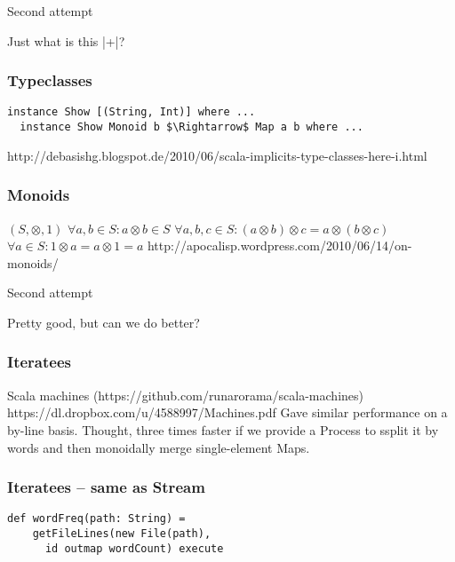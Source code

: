 \documentclass{beamer}
\begin{document}
\begin{frame}{Second attempt}
  \Large \centerline{Just what is this |+|?}
\end{frame}

\begin{frame}[fragile]
\frametitle{Typeclasses}
\begin{lstlisting}[mathescape]
  instance Show [(String, Int)] where ...
  instance Show Monoid b $\Rightarrow$ Map a b where ...
\end{lstlisting}
http://debasishg.blogspot.de/2010/06/scala-implicits-type-classes-here-i.html
\end{frame}

\begin{frame}[fragile]
\frametitle{Monoids}
\begin{center}
$(S, \otimes, 1)$\newline
$\forall a, b \in S: a \otimes b \in S$\newline
$\forall a, b, c \in S: (a \otimes b) \otimes c = a \otimes (b \otimes c)$\newline
$\forall a \in S: 1 \otimes a = a \otimes 1 = a$\newline
http://apocalisp.wordpress.com/2010/06/14/on-monoids/
\end{center}
\end{frame}

\begin{frame}{Second attempt}
  \Large \centerline{Pretty good, but can we do better?}
\end{frame}

\begin{frame}[fragile]
\frametitle{Iteratees}
\Large Scala machines (https://github.com/runarorama/scala-machines) \normalsize
https://dl.dropbox.com/u/4588997/Machines.pdf\newline
Gave similar performance on a by-line basis.\newline
Thought, three times faster if we provide a Process to ssplit it by
words and then monoidally merge single-element Maps.
\end{frame}

\begin{frame}[fragile]
\frametitle{Iteratees -- same as Stream}
\begin{lstlisting}[mathescape]
  def wordFreq(path: String) =
    getFileLines(new File(path),
      id outmap wordCount) execute
\end{lstlisting}
\end{frame}
\end{document}
